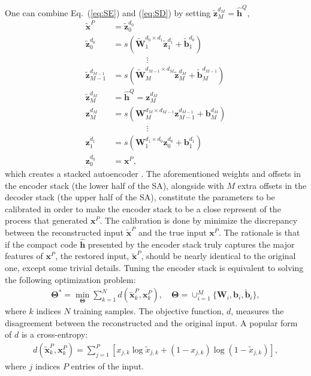 \documentclass[11pt]{article}
\newcommand{\vecEC}[1]{\boldsymbol{#1}}
\newcommand{\vecDC}[1]{\boldsymbol{\tilde{#1}}}
\newcommand{\WEC}{\vecEC{W}}                   %
\newcommand{\WEI}[3]{\WEC_{#1}^{d_{#2} \times d_{#3}}} %
\newcommand{\WDC}{\vecDC{W}}                   %
\newcommand{\WDI}[3]{\WDC_{#1}^{d_{#2} \times d_{#3}}} %
\newcommand{\bEC}{\vecEC{b}}    %
\newcommand{\bEI}[2]{\bEC_{#1}^{d_{#2}}} %
\newcommand{\bDC}{\vecDC{b}}    %
\newcommand{\bDI}[2]{\bDC_{#1}^{d_{#2}}} %
\newcommand{\xEC}{\vecEC{x}}
\newcommand{\xDC}{\vecDC{x}}
\newcommand{\hHT}{\boldsymbol{\hat{h}}}
\newcommand{\zEC}{\vecEC{z}}
\newcommand{\zDC}{\vecDC{z}}
\newcommand{\zEI}[2]{\zEC_{#1}^{d_{#2}}}
\newcommand{\zDI}[2]{\zDC_{#1}^{d_{#2}}}
\newcommand{\Par}{\boldsymbol{\Theta}}
\begin{document}
One can combine Eq.~(\ref{eq:SE}) and (\ref{eq:SD}) by setting $\zDI{M}{M} = \hHT^Q$,
\begin{equation} \label{eq:SA}
  \begin{split}
    \xDC^P &= \zDI{0}{0} \\
    \zDI{0  }{0  } &= s(\WDI{1  }{0  }{1  } \zDI{1  }{1  } + \bDI{1}{0  }) \\
    & \quad \quad \quad \quad \vdots \\
    \zDI{M-1}{M-1} &= s(\WDI{M  }{M-1}{M  } \zDI{M  }{M  } + \bDI{M}{M-1}) \\
    \zDI{M  }{M  } &= \hHT^Q = \zEI{M}{M} \\
    \zEI{M  }{M  } &= s(\WEI{M  }{M  }{M-1} \zEI{M-1}{M-1} + \bEI{M}{M  }) \\
    & \quad \quad \quad \quad \vdots \\
    \zEI{1  }{1  } &= s(\WEI{1  }{1  }{0  } \zEI{0  }{0  } + \bEI{1}{1  }) \\
    \zEI{0  }{0  } &= \xEC^P,
  \end{split}
\end{equation}
which creates a stacked autoencoder \citep{DL:SDA1}. The aforementioned weights and offsets in the encoder stack (the lower half of the SA), alongside with $M$ extra offsets in the decoder stack (the upper half of the SA), constitute the parameters to be calibrated in order to make the encoder stack to be a close represent of the process that generated $\xEC^P$. The calibration is done by minimize the discrepancy between the reconstructed input $\xDC^P$ and the true input $\xEC^P$. The rationale is that if the compact code $\hHT$ presented by the encoder stack truly captures the major features of $\xEC^P$, the restored input, $\xDC^P$, should be nearly identical to the original one, except some trivial details. Tuning the encoder stack is equivalent to solving the following optimization problem:
\begin{equation} \label{eq:CE}
  \begin{split}
    \Par^* = \min_{\Par} \sum_{k=1}^N{d(\xDC_k^P, \xEC_k^P)}, \quad \Par = \cup_{i=1}^M \{\WEC_i, \bEC_i, \bDC_i\},
  \end{split}
\end{equation}
where $k$ indices $N$ training samples. The objective function, $d$, measures the disagreement between the reconstructed and the original input. A popular form of $d$ is a cross-entropy:
\begin{align} \label{eq:CE}
  d(\xDC_k^P, \xEC_k^P) = \sum_{j=1}^P[{x_{j,k}\log{\tilde{x}_{j,k}} + (1 - x_{j,k})\log{(1 - \tilde{x}_{j,k})}}],
\end{align}
where $j$ indices $P$ entries of the input. 
\end{document}
